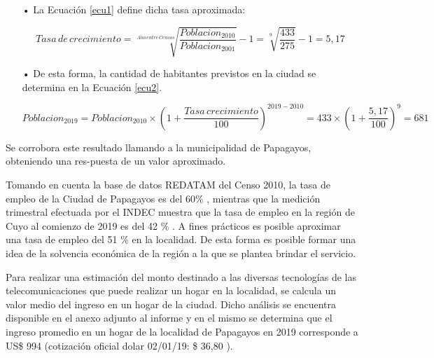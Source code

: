 \begin{enumerate}
\item[•]La Ecuación \ref{ecu1} define dicha tasa aproximada:

\begin{equation}
Tasa\, de \, crecimiento= \sqrt[A\tilde{n}o\, entre \, Censos]{  \frac{Poblacion_{2010}}{Poblacion_{2001}}  } -1 =\sqrt[9]{  \frac{433}{275}  } -1 = 5,17%
\label{ecu1}
\end{equation}

\item[•]De esta forma, la cantidad de habitantes previstos en la ciudad se determina en la Ecuación \ref{ecu2}.

\begin{equation}
Poblacion_{2019}=Poblacion_{2010} \times \left ( 1 + \frac{Tasa \, crecimiento}{100} \right )^{2019-2010}=433 \times \left ( 1 + \frac{5,17}{100} \right )^{9}=681
\label{ecu2}
\end{equation}

\end{enumerate}

Se corrobora este resultado llamando a la municipalidad de Papagayos, obteniendo una res-puesta de un valor aproximado.


Tomando en cuenta la base de datos REDATAM del Censo 2010, la tasa de empleo de la Ciudad de Papagayos es del 60\% \cite{ocupacion}, mientras que la medición trimestral efectuada por el INDEC muestra que la tasa de empleo en la región de Cuyo al comienzo de 2019 es del 42 \% \cite{base-datos-abiertos}. A fines prácticos es posible aproximar una tasa de empleo del 51 \% en la localidad. De esta forma es posible formar una idea de la solvencia económica de la región a la que se plantea brindar el servicio. 


Para realizar una estimación del monto destinado a las diversas tecnologías de las telecomunicaciones que puede realizar un hogar en la localidad, se calcula un valor medio del ingreso en un hogar de la ciudad. Dicho análisis se encuentra disponible en el anexo adjunto al informe y en el mismo se determina que el ingreso promedio en un hogar de la localidad de Papagayos en 2019 corresponde a US\$ 994 (cotización oficial dolar 02/01/19: \$ 36,80 ). 


